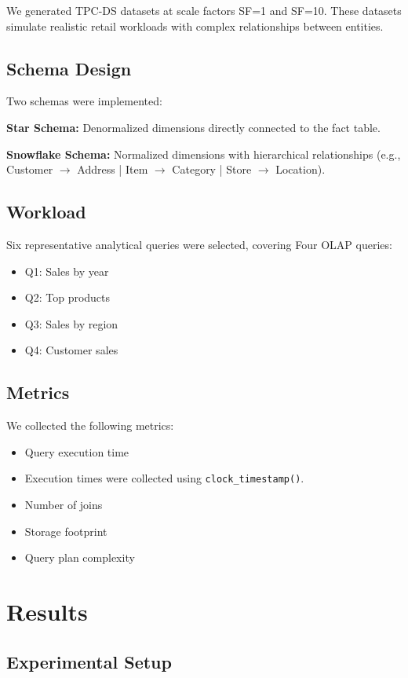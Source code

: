 \documentclass[conference]{IEEEtran}
\begin{document}
We generated TPC-DS datasets at scale factors SF=1 and SF=10. These datasets simulate realistic retail workloads with complex relationships between entities.

\subsection{Schema Design}

Two schemas were implemented:

\textbf{Star Schema:}
Denormalized dimensions directly connected to the fact table.

\textbf{Snowflake Schema:}
Normalized dimensions with hierarchical relationships (e.g., Customer $\rightarrow$ Address | Item $\rightarrow$ Category | Store $\rightarrow$ Location).
\subsection{Workload}

Six representative analytical queries were selected, covering Four OLAP queries:
\begin{itemize}
\item Q1: Sales by year
\item Q2: Top products
\item Q3: Sales by region
\item Q4: Customer sales
\end{itemize}

\subsection{Metrics}

We collected the following metrics:
\begin{itemize}
\item Query execution time
\item Execution times were collected using \texttt{clock\_timestamp()}.
\item Number of joins
\item Storage footprint
\item Query plan complexity
\end{itemize}


\section{Results}

\subsection{Experimental Setup}
\end{document}
